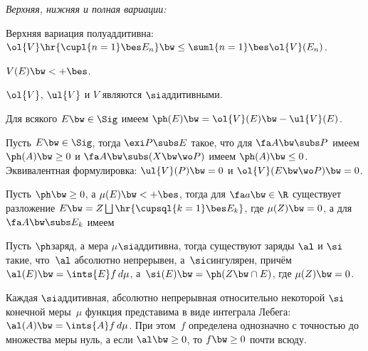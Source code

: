 \documentclass[a4paper,draft]{article}
\begin{document}
\begin{df}
  \emph{Верхняя, нижняя и полная вариации:}
\end{df}

\begin{stm}
  Верхняя вариация полуаддитивна: $\ol{V}\hr{\cupl{n=1}\bes E_n} \bw\le \suml{n=1}\bes \ol{V}(E_n)$.
\end{stm}

\begin{stm}
  $V(E) \bw< +\bes$.
\end{stm}

\begin{stm}
  $\ol{V}$, $\ul{V}$ и $V$ являются $\si$\д аддитивными.
\end{stm}

\begin{theorem}
  Для всякого $E \bw\in \Sig$ имеем $\ph(E) \bw= \ol{V}(E) \bw- \ul{V}(E)$.
\end{theorem}

\begin{theorem}
  Пусть $E \bw\in \Sig$, тогда $\exi P\subs E$ такое, что для $\fa A \bw\subs P$
  имеем $\ph(A) \bw\ge 0$ и $\fa A \bw\subs (X \bw\wo P)$ имеем $\ph(A) \bw\le 0$.
  Эквивалентная формулировка: $\ul{V}(P) \bw= 0$ и $\ol{V}(E \bw\wo P) \bw= 0$.
\end{theorem}

\begin{theorem}
  Пусть $\ph \bw\ge 0$, а $\mu(E) \bw< +\bes$, тогда
  для $\fa a \bw\in \R$ существует разложение
  $E \bw= Z \bigsqcup \hr{\cupsql{k=1}\bes E_k}$, где $\mu(Z) \bw= 0$, а для $\fa A \bw\subs E_k$ имеем
\end{theorem}

\begin{theorem}
  Пусть $\ph$\т заряд, а мера $\mu$\т $\si$\д аддитивна, тогда существуют заряды $\al$ и $\si$ такие,
  что~$\al$ абсолютно непрерывен, а~$\si$\т сингулярен, причём $\al(E) \bw= \ints{E}f\,d\mu$,
  а~$\si(E) \bw= \ph(Z \bw\cap E)$, где $\mu(Z) \bw= 0$.
\end{theorem}

\begin{theorem}
  Каждая $\si$\д аддитивная, абсолютно непрерывная
  относительно некоторой $\si$\д конечной меры~$\mu$ функция
  представима в виде интеграла Лебега: $\al(A) \bw= \ints{A}f\,d\mu$.
  При этом~$f$ определена однозначно с точностью до множества меры нуль,
  а если $\al \bw\ge 0$, то $f \bw\ge 0$ почти всюду.
\end{theorem}
\end{document}
